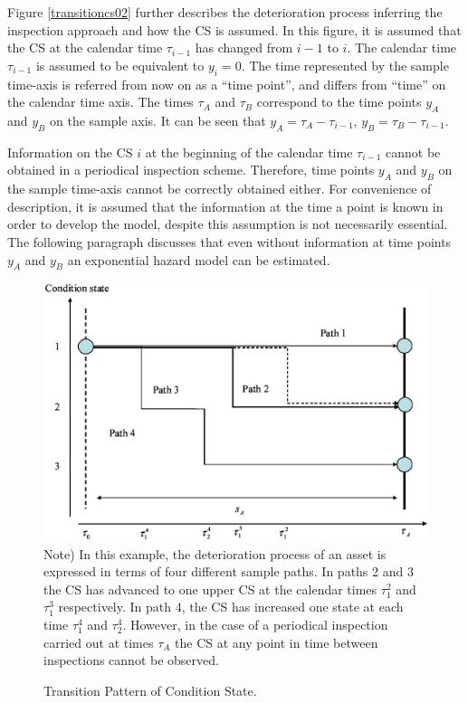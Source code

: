 Figure \ref{transitioncs02} further describes the deterioration process inferring the inspection approach and how the CS is assumed. In this figure, it is assumed that the CS at the calendar time $\tau_{i-1}$ has changed from $i-1$ to $i$. The calendar time $\tau_{i-1}$ is assumed to be equivalent to $y_i=0$. The time represented by the sample time-axis is referred from now on as a ``time point'', and differs from ``time'' on the calendar time axis. The times $\tau_A$ and $\tau_B$ correspond to the time points $y_A$ and $y_B$ on the sample axis. It can be seen that $y_A=\tau_A-\tau_{i-1}$, $y_B=\tau_B-\tau_{i-1}$. 

Information on the CS $i$ at the beginning of the calendar time $\tau_{i-1}$ cannot be obtained in a periodical inspection scheme. Therefore, time points $y_A$ and $y_B$ on the sample time-axis cannot be correctly obtained either. For convenience of description, it is assumed that the information at the time a point is known in order to develop the model, despite this assumption is not necessarily essential. The following paragraph discusses that even without information at time points $y_A$ and $y_B$ an exponential hazard model can be estimated.
\begin{figure}[!htb]
		\includegraphics[scale=0.4]{figures/transitioncs01.eps} \\
	\footnotesize Note) In this example, the deterioration process of an asset is expressed in terms of four different sample paths. In paths 2 and 3 the CS has advanced to one upper CS at the calendar times $\tau_1^2$ and $\tau_1^3$ respectively. In path 4, the CS has increased one state at each time $\tau_1^4$ and $\tau_{2}^4$. However, in the case of a periodical inspection carried out at times $\tau_A$ the CS at any point in time between inspections cannot be observed.
	\caption{Transition Pattern of Condition State.}
	\label{transitioncs01} 
\end{figure}

